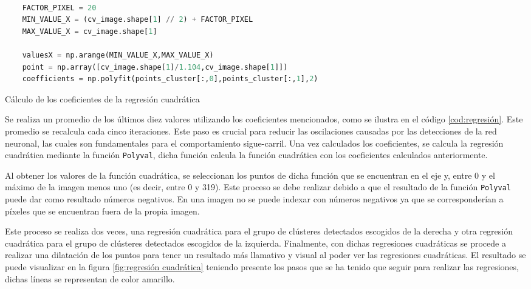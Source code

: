 \begin{code}[H]
  \begin{lstlisting}[language=Python]
  
    FACTOR_PIXEL = 20
    MIN_VALUE_X = (cv_image.shape[1] // 2) + FACTOR_PIXEL
    MAX_VALUE_X = cv_image.shape[1]
  
    valuesX = np.arange(MIN_VALUE_X,MAX_VALUE_X) 
    point = np.array([cv_image.shape[1]/1.104,cv_image.shape[1]])
    coefficients = np.polyfit(points_cluster[:,0],points_cluster[:,1],2)
  \end{lstlisting}
  \caption[Calculo de los coeficientes]{Cálculo de los coeficientes de la regresión cuadrática}
  \label{cod:Calculocoeficientes}
  \vspace{-1.5em}
  \end{code}  
Se realiza un promedio de los últimos diez valores utilizando los coeficientes mencionados, como se ilustra en el código \ref{cod:regresión}. Este promedio se recalcula 
cada cinco iteraciones. Este paso es crucial para reducir las oscilaciones causadas por las detecciones de la red neuronal, las cuales son fundamentales para el comportamiento sigue-carril. Una vez calculados los 
coeficientes, se calcula la regresión cuadrática mediante la función \texttt{Polyval}, dicha función calcula
la función cuadrática con los coeficientes calculados anteriormente. 

Al obtener los valores de la función cuadrática, se seleccionan los puntos de dicha función que se encuentran en el eje y, entre 0 y el máximo de la imagen menos uno (es decir, entre 0 y 319). 
Este proceso se debe realizar debido a que el resultado de la función \texttt{Polyval} puede dar como resultado números negativos. En una imagen no se puede indexar con números negativos ya que 
se corresponderían a píxeles que se encuentran fuera de la propia imagen.

Este proceso se realiza dos veces, una regresión cuadrática para el grupo de clústeres detectados escogidos de la derecha y otra regresión cuadrática para el grupo de clústeres detectados
escogidos de la izquierda. 
Finalmente, con dichas regresiones cuadráticas se procede a realizar una dilatación de los puntos para tener un resultado más llamativo y visual al poder
ver las regresiones cuadráticas. El resultado se puede visualizar en la figura \ref{fig:regresión cuadrática} teniendo presente los pasos que se ha tenido que seguir para 
realizar las regresiones, dichas líneas se representan de color amarillo.

